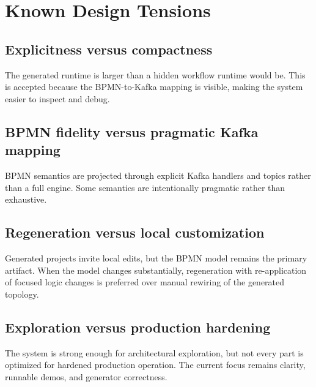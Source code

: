 \section{Known Design Tensions}
\label{sec:DesignTensions}

\subsection{Explicitness versus compactness}

The generated runtime is larger than a hidden workflow runtime would be. This is accepted
because the BPMN-to-Kafka mapping is visible, making the system easier to inspect and debug.

\subsection{BPMN fidelity versus pragmatic Kafka mapping}

BPMN semantics are projected through explicit Kafka handlers and topics rather than a full
engine. Some semantics are intentionally pragmatic rather than exhaustive.

\subsection{Regeneration versus local customization}

Generated projects invite local edits, but the BPMN model remains the primary artifact.
When the model changes substantially, regeneration with re-application of focused logic
changes is preferred over manual rewiring of the generated topology.

\subsection{Exploration versus production hardening}

The system is strong enough for architectural exploration, but not every part is optimized
for hardened production operation. The current focus remains clarity, runnable demos, and
generator correctness.
